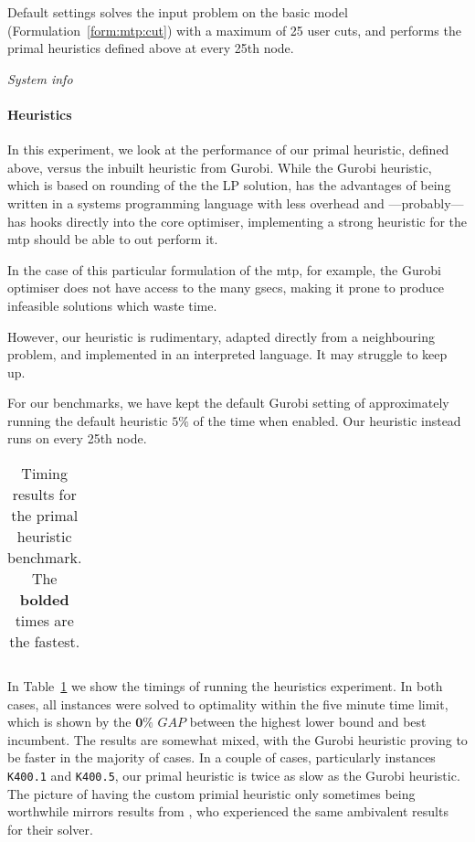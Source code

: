  Default settings solves the input problem on the basic model (Formulation~\ref{form:mtp:cut})
 with a maximum of 25 user cuts, and performs the primal heuristics defined above at every
 25th node.

\textit{System info}

\paragraph{Heuristics}
In this experiment, we look at the performance of our primal heuristic, defined above, versus
the inbuilt heuristic from Gurobi. While the Gurobi heuristic, which is based on rounding
of the the LP solution, has the advantages of being written in a systems programming language
with less overhead and ---probably--- has hooks directly into the core optimiser,
implementing a strong heuristic for the \gls{mtp} should be able to out perform it.

In the case of this particular formulation of the \gls{mtp},
for example, the Gurobi optimiser does not have access to the
many \glspl{gsec}, making it prone to produce infeasible solutions which waste time.

However, our heuristic is rudimentary, adapted directly from a neighbouring problem,
and implemented in an interpreted language. It may struggle to keep up.

For our benchmarks, we have kept the default Gurobi setting of approximately running
the default heuristic $5\%$ of the time when enabled. Our heuristic instead runs on
every 25th node.

\begin{table}[h!]
  \centering
  \begin{tabular}[h!]{|c|c|c|c|c|}\hline
    
  \end{tabular}
  \caption{Timing results for the primal heuristic benchmark. The
    \textbf{bolded} times are the fastest.}
  \label{tab:jmp:heuristics}
\end{table}

In Table~\ref{tab:jmp:heuristics} we show the timings of running the heuristics experiment.
In both cases, all instances were solved to optimality within the five minute time limit, which
is shown by the $\mathbf{0\%}$ $GAP$ between the highest lower bound and best incumbent.
The results are somewhat mixed, with the Gurobi heuristic proving to be faster in the majority
of cases. In a couple of cases, particularly instances \texttt{K400.1} and \texttt{K400.5},
our primal heuristic is twice as slow as the Gurobi heuristic. The picture of having the
custom primial heuristic only sometimes being worthwhile mirrors results from
\citet{ljubic2005solving}, who experienced the same ambivalent results for their solver.

